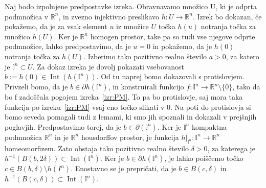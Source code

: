 \documentclass[mat1]{fmfdelo}
\newcommand{\R}{\mathbb R}
\DeclareMathOperator{\Int}{Int}
\newcommand{\I}{\mathbb I}
\newcommand{\0}{0}
\begin{document}
\begin{dokaz}
Naj bodo izpolnjene predpostavke izreka. Obravnavamo množico U, ki je odprta podmnožica v $\R^n$, in zvezno injektivno preslikavo $h : U \rightarrow \R^n$. Izrek bo dokazan, če pokažemo, da je za vsak element $u$ iz množice $U$ točka $h(u)$ notranja točka za množico $h(U)$. Ker je $\R^n$ homogen prostor, take pa so tudi vse njegove odprte podmnožice, lahko predpostavimo, da je $u = \0$ in pokažemo, da je $h(\0)$ notranja točka za $h(U)$. Izberimo tako pozitivno realno število $a > 0$, za katero je $\I^n \subset U$. Za dokaz izreka je dovolj pokazati vsebovanost $b := h(\0) \in \Int(h(\I^n))$. Od tu naprej bomo dokazovali s protislovjem. Privzeli bomo, da je $b \in \partial h(\I^n)$, in konstruirali funkcijo $f : \I^n \to \R^n \setminus \{ \0 \}$, tako da bo f zadoščala pogojem izreka~\ref{izr:PM}. To pa bo protislovje, saj mora taka funkcija po izreku~\ref{izr:PM} vsaj eno točko slikati v $0$. Na poti do protislovja si bomo seveda pomagali tudi z lemami, ki smo jih spoznali in dokazali v prejšnjih poglavjih. Predpostavimo torej, da je $b \in \partial (\I^n)$. Ker je $\I^n$ kompaktna podmnožica $\R^n$ in je $\R^n$ housdorffov prostor, je funkcija $h|_{\I^n} : \I^n \to \R^n$ homeomorfizem. Zato obstaja tako pozitivno realno število $\delta > 0$, za katerega je $h^{-1}(B(b, 2 \delta)) \subset \Int(\I^n)$. Ker je $b \in \partial h(\I^n)$, je lahko poiščemo točko $c \in B(b, \delta) \setminus h(I^n)$. Enostavno se je prepričati, da je $b \in B(c, \delta)$ in $h^{-1} (B(c, \delta)) \subset \Int (\I^n)$.


\end{dokaz}
\end{document}
